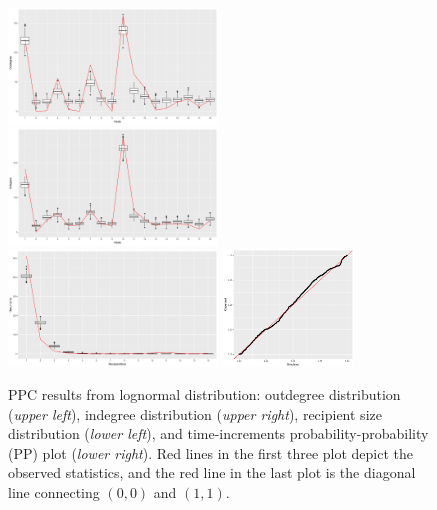 \documentclass[12pt]{article}
\begin{document}
	\begin{figure}[!t]
		\centering
		\includegraphics[width=0.495\textwidth]{plots_paper/outdegreenew-1.png}	
		\includegraphics[width=0.495\textwidth]{plots_paper/indegreenew-1.png}	
		\includegraphics[width=0.495\textwidth]{plots_paper/recipientsizenew-1.png}	
		\includegraphics[width=0.31\textwidth]{plots_paper/timeppnew.pdf}
		\caption {PPC results from lognormal distribution: outdegree distribution (\textit{upper left}), indegree distribution (\textit{upper right}), recipient size distribution (\textit{lower left}), and time-increments probability-probability (PP) plot  (\textit{lower right}). Red lines in the first three plot depict the observed statistics, and the red line in the last plot is the diagonal line connecting $(0, 0)$ and $(1, 1)$.}
		\label{figure:PPCresults}
	\end{figure}
	
\end{document}

